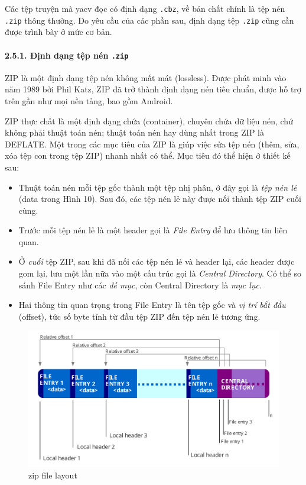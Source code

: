 Các tệp truyện mà yacv đọc có định dạng \texttt{.cbz}, về bản chất chính
là tệp nén \texttt{.zip} thông thường. Do yêu cầu của các phần sau, định
dạng tệp \texttt{.zip} cũng cần được trình bày ở mức cơ bản.

\hypertarget{ux111ux1ecbnh-dux1ea1ng-tux1ec7p-nuxe9n-.zip}{%
  \paragraph{\texorpdfstring{2.5.1. Định dạng tệp nén
      \texttt{.zip}}{2.5.1. Định dạng tệp nén .zip}}\label{ux111ux1ecbnh-dux1ea1ng-tux1ec7p-nuxe9n-.zip}}

ZIP là một định dạng tệp nén không mất mát (lossless). Được phát minh vào
năm 1989 bởi Phil Katz, ZIP đã trở thành định dạng nén tiêu chuẩn, được
hỗ trợ trên gần như mọi nền tảng, bao gồm Android.

ZIP thực chất là một định dạng chứa (container), chuyên chứa dữ liệu
nén, chứ không phải thuật toán nén; thuật toán nén hay dùng nhất trong
ZIP là DEFLATE. Một trong các mục tiêu của ZIP là giúp việc sửa tệp nén
(thêm, sửa, xóa tệp con trong tệp ZIP) nhanh nhất có thể. Mục tiêu đó
thể hiện ở thiết kế sau:

\begin{itemize}
  
  \item
        Thuật toán nén mỗi tệp gốc thành một tệp nhị phân, ở đây gọi là
        \emph{tệp nén lẻ} (data trong Hình 10). Sau đó, các tệp nén lẻ này
        được nối thành tệp ZIP cuối cùng.
  \item
        Trước mỗi tệp nén lẻ là một header gọi là \emph{File Entry} để lưu
        thông tin liên quan.
  \item
        Ở \emph{cuối} tệp ZIP, sau khi đã nối các tệp nén lẻ và header lại,
        các header được gom lại, lưu một lần nữa vào một cấu trúc gọi là
        \emph{Central Directory}. Có thể so sánh File Entry như các \emph{đề
          mục}, còn Central Directory là \emph{mục lục}.
  \item
        Hai thông tin quan trọng trong File Entry là tên tệp gốc và \emph{vị
          trí bắt đầu} (offset), tức số byte tính từ đầu tệp ZIP đến tệp nén lẻ
        tương ứng.
\end{itemize}

\begin{figure}
  \centering
  \includegraphics{../images/ZIP-64_Internal_Layout.svg}
  \caption{zip file layout}
\end{figure}

